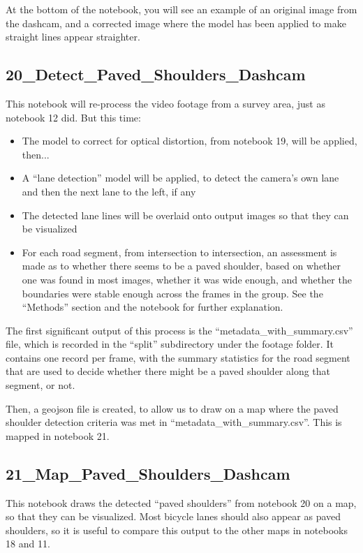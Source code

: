 \documentclass[11pt,twoside]{report}
\begin{document}
At the bottom of the notebook, you will see an example of an original image from the dashcam, and a corrected image where the model has been applied to make straight lines appear straighter.


\subsection{20\_Detect\_Paved\_Shoulders\_Dashcam}
\label{a20}

This notebook will re-process the video footage from a survey area, just as notebook 12 did.  But this time:

\begin{itemize}
\item{The model to correct for optical distortion, from notebook 19, will be applied, then...}
\item{A ``lane detection'' model will be applied, to detect the camera's own lane and then the next lane to the left, if any}
\item{The detected lane lines will be overlaid onto output images so that they can be visualized}
\item{For each road segment, from intersection to intersection, an assessment is made as to whether there seems to be a paved shoulder, based on whether one was found in most images, whether it was wide enough, and whether the boundaries were stable enough across the frames in the group.  See the ``Methods'' section and the notebook for further explanation.}	
\end{itemize}

The first significant output of this process is the ``metadata\_with\_summary.csv'' file, which is recorded in the ``split'' subdirectory under the footage folder.  It contains one record per frame, with the summary statistics for the road segment that are used to decide whether there might be a paved shoulder along that segment, or not.

Then, a geojson file is created, to allow us to draw on a map where the paved shoulder detection criteria was met in ``metadata\_with\_summary.csv''.  This is mapped in notebook 21.


\subsection{21\_Map\_Paved\_Shoulders\_Dashcam}
\label{a21}

This notebook draws the detected ``paved shoulders'' from notebook 20 on a map, so that they can be visualized.  Most bicycle lanes should also appear as paved shoulders, so it is useful to compare this output to the other maps in notebooks 18 and 11.


\cleardoublepage


\end{document}
